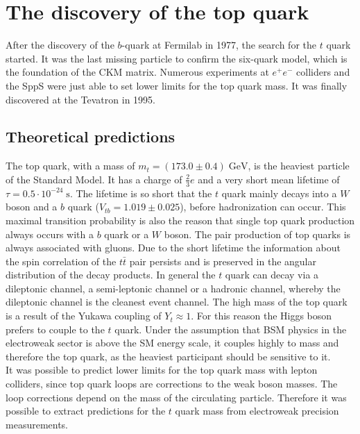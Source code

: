 \section{The discovery of the top quark \cite{top-quark}}
After the discovery of the $b$-quark at Fermilab in 1977, the search for the $t$ quark started. It was the last missing particle to confirm the six-quark model, which is the foundation of the CKM matrix. Numerous experiments at $e^+e^-$ colliders and the SppS were just able to set lower limits for the top quark mass. It was finally discovered at the Tevatron in 1995.
\subsection{Theoretical predictions}
The top quark, with a mass of $m_t=(173.0\pm0.4)\;\si{\GeV}$, is the heaviest particle of the Standard Model. It has a charge of $\frac{2}{3}e$ and a very short mean lifetime of $\tau = 0.5\cdot 10^{-24}\;\si{\second}$. The lifetime is so short that the $t$ quark mainly decays into a $W$ boson and a $b$ quark ($V_{tb}= 1.019 \pm 0.025$), before hadronization can occur. This maximal transition probability is also the reason that single top quark production always occurs with a $b$ quark or a $W$ boson. The pair production of top quarks is always associated with gluons. Due to the short lifetime the information about the spin correlation of the $t\bar{t}$ pair persists and is preserved in the angular distribution of the decay products. In general the $t$ quark can decay via a dileptonic channel, a semi-leptonic channel or a hadronic channel, whereby the dileptonic channel is the cleanest event channel.
The high mass of the top quark is a result of the Yukawa coupling of $Y_t \approx 1$.
For this reason the Higgs boson prefers to couple to the $t$ quark. Under the assumption that BSM physics in the electroweak sector is above the SM energy scale, it couples highly to mass and therefore the top quark, as the heaviest participant should be sensitive to it.\\
It was possible to predict lower limits for the top quark mass with lepton colliders, since top quark loops are corrections to the weak boson masses. The loop corrections depend on the mass of the circulating particle. Therefore it was possible to extract predictions for the $t$ quark mass from electroweak precision measurements.

